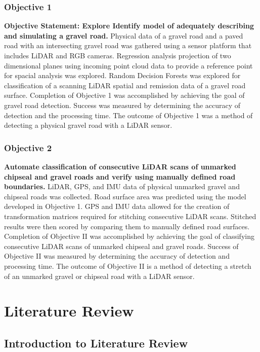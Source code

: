 \documentclass[numbered,pdftex]{ohio-etd}
\begin{document}
{	\subsection{Objective 1}
	
		{\textbf{Objective Statement: Explore Identify model of adequately describing and simulating a gravel road.} Physical data of a gravel road and a paved road with an intersecting gravel road was gathered using a sensor platform that includes LiDAR and RGB cameras. Regression analysis projection of two dimensional planes using incoming point cloud data to provide a reference point for spacial analysis was explored. Random Decision Forests was explored for classification of a scanning LiDAR spatial and remission data of a gravel road surface. Completion of Objective 1 was accomplished by achieving the goal of gravel road detection. Success was measured by determining the accuracy of detection and the processing time. The outcome of Objective 1 was a method of detecting a physical gravel road with a LiDAR sensor.}

	\subsection{Objective 2}

		{\textbf{Automate classification of consecutive LiDAR scans of unmarked chipseal and gravel roads and verify using manually defined road boundaries.} LiDAR, GPS, and IMU data of physical unmarked gravel and chipseal roads was collected. Road surface area was predicted using the model developed in Objective 1. GPS and IMU data allowed for the creation of transformation matrices required for stitching consecutive LiDAR scans. Stitched results were then scored by comparing them to manually defined road surfaces. Completion of Objective II was accomplished by achieving the goal of classifying consecutive LiDAR scans of unmarked chipseal and gravel roads. Success of Objective II was measured by determining the accuracy of detection and processing time. The outcome of Objective II is a method of detecting a stretch of an unmarked gravel or chipseal road with a LiDAR sensor.}


\chapter{Literature Review}

	\section{Introduction to Literature Review}
		
}
\end{document}
